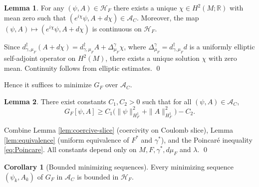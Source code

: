 \documentclass[fleqn,11pt,twoside]{article}
\makeatletter
\renewenvironment{proof}[1][\proofname]{\par
  \normalfont
  \topsep6\p@\@plus6\p@ \trivlist
  \item[\hskip\labelsep\textbf{%
    #1\@addpunct{.}}]\ignorespaces
}{%
  \qed\endtrivlist
}
\theoremstyle{definition}
\newtheorem{lemma}{Lemma}
\newtheorem{corollary}{Corollary}
\makeatother
\begin{document}
\begin{lemma}\label{lem:gauge-fix}
For any $(\psi,A)\in \mathcal{H}_F$ there exists a unique
$\chi\in H^2(M;\mathbb{R})$ with mean zero such that
$(e^{i\chi}\psi, A+d\chi)\in\mathcal{A}_C$. Moreover, the map
$(\psi,A)\mapsto(e^{i\chi}\psi, A+d\chi)$ is continuous on $\mathcal{H}_F$.
\end{lemma}

\begin{proof}
Since $d^\dagger_{\gamma,\mu_F}(A+d\chi)
 = d^\dagger_{\gamma,\mu_F}A + \Delta^\gamma_{\mu_F}\chi$,
where $\Delta^\gamma_{\mu_F} = d^\dagger_{\gamma,\mu_F} d$
is a uniformly elliptic self-adjoint operator on $H^2(M)$,
there exists a unique solution $\chi$ with zero mean.
Continuity follows from elliptic estimates.
\end{proof}

Hence it suffices to minimize $G_F$ over $\mathcal{A}_C$.
\begin{lemma}\label{lem:exist-coercive}
There exist constants $C_1,C_2>0$ such that for all $(\psi,A)\in\mathcal{A}_C$,
\begin{equation}\label{eq:coercive-bound}
  G_F[\psi,A] \ge
  C_1\big( \|\psi\|_{H^1_F}^2 + \|A\|_{H^1_F}^2 \big) - C_2.
\end{equation}
\end{lemma}

\begin{proof}
Combine Lemma \ref{lem:coercive-slice} (coercivity on Coulomb slice), Lemma \ref{lem:equivalence} (uniform equivalence of $F^*$ and $\gamma^*$), and the Poincaré inequality \eqref{eq:Poincare}. All constants depend only on $M,F,\gamma^*,d\mu_F$ and $\lambda$.
\end{proof}

\begin{corollary}[Bounded minimizing sequences]
Every minimizing sequence $(\psi_k,A_k)$ of $G_F$ in $\mathcal{A}_C$ is bounded in $\mathcal{H}_F$.
\end{corollary}


\end{document}

